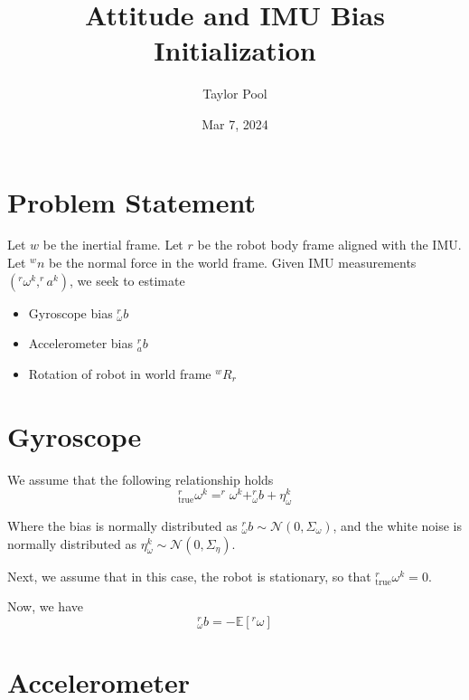 \documentclass{article}
\title{Attitude and IMU Bias Initialization}
\author{Taylor Pool}
\date{Mar 7, 2024}
\begin{document}
\maketitle

\section{Problem Statement}

Let $w$ be the inertial frame. Let $r$ be the robot body frame aligned with the IMU. Let $^w n$ be the normal force in the world frame.
Given IMU measurements $(^r \omega^k, ^r a^k)$, we seek to estimate

\begin{itemize}
	\item Gyroscope bias $^r_\omega b$
	\item Accelerometer bias $^r_a b$
	\item Rotation of robot in world frame $^w R_r$
\end{itemize}

\section{Gyroscope}

We assume that the following relationship holds
\begin{equation}
	^r_\mathrm{true} \omega^k = ^r \omega^k + ^r_\omega b + \eta_\omega^k
\end{equation}

Where the bias is normally distributed as $^r_\omega b \sim \mathcal{N}(0, \Sigma_\omega)$,
and the white noise is normally distributed as $\eta_\omega^k \sim \mathcal{N}(0, \Sigma_\eta)$.

Next, we assume that in this case, the robot is stationary, so that $^r_\mathrm{true} \omega^k = 0$.

Now, we have
\begin{equation}
	^r_\omega b = -\mathbb{E}\left[^r \omega\right]
\end{equation}

\section{Accelerometer}
\end{document}
